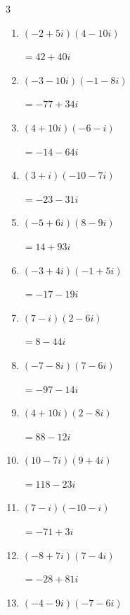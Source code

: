 \begin{multicols}{3}
\begin{enumerate}
        $\displaystyle =-32-42i$

  \item $\displaystyle (-2+5i)(4-10i)$

        $\displaystyle =42+40i$

  \item $\displaystyle (-3-10i)(-1-8i)$

        $\displaystyle =-77+34i$

  \item $\displaystyle (4+10i)(-6-i)$

        $\displaystyle =-14-64i$

  \item $\displaystyle (3+i)(-10-7i)$

        $\displaystyle =-23-31i$

  \item $\displaystyle (-5+6i)(8-9i)$

        $\displaystyle =14+93i$

  \item $\displaystyle (-3+4i)(-1+5i)$

        $\displaystyle =-17-19i$

\columnbreak %

\resetques

  \item $\displaystyle (7-i)(2-6i)$

        $\displaystyle =8-44i$

  \item $\displaystyle (-7-8i)(7-6i)$

        $\displaystyle =-97-14i$

  \item $\displaystyle (4+10i)(2-8i)$

        $\displaystyle =88-12i$

  \item $\displaystyle (10-7i)(9+4i)$

        $\displaystyle =118-23i$

  \item $\displaystyle (7-i)(-10-i)$

        $\displaystyle =-71+3i$

  \item $\displaystyle (-8+7i)(7-4i)$

        $\displaystyle =-28+81i$

  \item $\displaystyle (-4-9i)(-7-6i)$


\end{enumerate}
\end{multicols}
